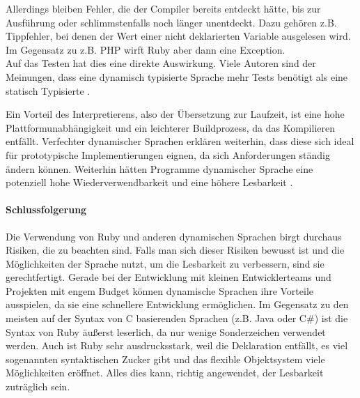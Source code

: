 Allerdings bleiben Fehler, die der Compiler bereits entdeckt hätte, bis zur Ausführung oder schlimmstenfalls noch länger unentdeckt. Dazu gehören z.B. Tippfehler, bei denen der Wert einer nicht deklarierten Variable ausgelesen wird. Im Gegensatz zu z.B. PHP wirft Ruby aber dann eine Exception.\\
Auf das Testen hat dies eine direkte Auswirkung. Viele Autoren sind der Meinungen, dass eine dynamisch typisierte Sprache mehr Tests benötigt als eine statisch Typisierte \citep{daniel_spiewak_dynamic_2010}.



Ein Vorteil des Interpretierens, also der Übersetzung zur Laufzeit, ist eine hohe Plattformunabhängigkeit und ein leichterer Buildprozess, da das Kompilieren entfällt.
Verfechter dynamischer Sprachen erklären weiterhin, dass diese sich ideal für prototypische Implementierungen eignen, da sich Anforderungen ständig ändern können. Weiterhin hätten Programme dynamischer Sprache eine potenziell hohe Wiederverwendbarkeit und eine höhere Lesbarkeit \citep{meijer_static_2005,ousterhout_scripting:_1998}.


%
%
%
\paragraph{Schlussfolgerung}
Die Verwendung von Ruby und anderen dynamischen Sprachen birgt durchaus Risiken, die zu beachten sind. Falls man sich dieser Risiken bewusst ist und die Möglichkeiten der Sprache nutzt, um die Lesbarkeit zu verbessern, sind sie gerechtfertigt. Gerade bei der Entwicklung mit kleinen Entwicklerteams und Projekten mit engem Budget können dynamische Sprachen ihre Vorteile ausspielen, da sie eine schnellere Entwicklung ermöglichen. Im Gegensatz zu den meisten auf der Syntax von C basierenden Sprachen (z.B. Java oder C\#) ist die Syntax von Ruby äußerst leserlich, da nur wenige Sonderzeichen verwendet werden. Auch ist Ruby sehr ausdrucksstark, weil die Deklaration entfällt, es viel sogenannten syntaktischen Zucker gibt und das flexible Objektsystem viele Möglichkeiten eröffnet. Alles dies kann, richtig angewendet, der Lesbarkeit zuträglich sein.


